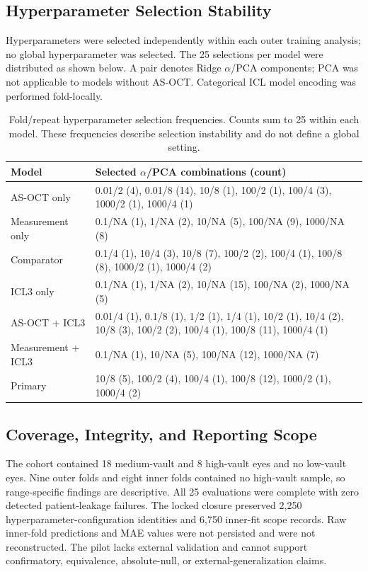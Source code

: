 \FloatBarrier

\subsection{Hyperparameter Selection Stability}

Hyperparameters were selected independently within each outer training analysis; no global hyperparameter was selected. The 25 selections per model were distributed as shown below. A pair denotes Ridge $\alpha$/PCA components; PCA was not applicable to models without AS-OCT. Categorical ICL model encoding was performed fold-locally.

\FloatBarrier

\begin{table}[H]
\centering
\caption{Fold/repeat hyperparameter selection frequencies. Counts sum to 25 within each model. These frequencies describe selection instability and do not define a global setting.}
\label{tab:supp_pilot_hyperparameters}
\scriptsize
\setlength{\tabcolsep}{3pt}
\begin{tabular}{lp{}}
\toprule
Model & Selected $\alpha$/PCA combinations (count) \\
\midrule
AS-OCT only & 0.01/2 (4), 0.01/8 (14), 10/8 (1), 100/2 (1), 100/4 (3), 1000/2 (1), 1000/4 (1) \\
Measurement only & 0.1/NA (1), 1/NA (2), 10/NA (5), 100/NA (9), 1000/NA (8) \\
Comparator & 0.1/4 (1), 10/4 (3), 10/8 (7), 100/2 (2), 100/4 (1), 100/8 (8), 1000/2 (1), 1000/4 (2) \\
ICL3 only & 0.1/NA (1), 1/NA (2), 10/NA (15), 100/NA (2), 1000/NA (5) \\
AS-OCT + ICL3 & 0.01/4 (1), 0.1/8 (1), 1/2 (1), 1/4 (1), 10/2 (1), 10/4 (2), 10/8 (3), 100/2 (2), 100/4 (1), 100/8 (11), 1000/4 (1) \\
Measurement + ICL3 & 0.1/NA (1), 10/NA (5), 100/NA (12), 1000/NA (7) \\
Primary & 10/8 (5), 100/2 (4), 100/4 (1), 100/8 (12), 1000/2 (1), 1000/4 (2) \\
\bottomrule
\end{tabular}
\end{table}

\FloatBarrier

\subsection{Coverage, Integrity, and Reporting Scope}

The cohort contained 18 medium-vault and 8 high-vault eyes and no low-vault eyes. Nine outer folds and eight inner folds contained no high-vault sample, so range-specific findings are descriptive. All 25 evaluations were complete with zero detected patient-leakage failures. The locked closure preserved 2,250 hyperparameter-configuration identities and 6,750 inner-fit scope records. Raw inner-fold predictions and MAE values were not persisted and were not reconstructed. The pilot lacks external validation and cannot support confirmatory, equivalence, absolute-null, or external-generalization claims.

\FloatBarrier
